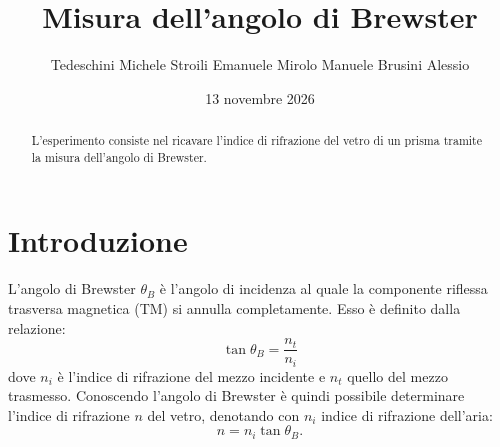 \documentclass[10pt,twocolumn]{article}
\begin{document}
    \justifying

      \title{\textbf{Misura dell'angolo di Brewster}}
      \author{Tedeschini Michele \hspace{0.7cm} Stroili Emanuele \hspace{0.7cm} Mirolo Manuele \hspace{0.7cm} Brusini Alessio}
      \date{13 novembre 2026}
      \maketitle
      \onecolumn
      \tableofcontents
    \vspace{3cm}
      \begin{abstract}
        \centering
        \large
        L'esperimento consiste nel ricavare l'indice di rifrazione del vetro di un prisma tramite la misura dell'angolo di Brewster.

      \end{abstract}

      \newpage
    \restoregeometry
    \twocolumn

\section{Introduzione}
L'angolo di Brewster $\theta_B$ è l'angolo di incidenza al quale la componente riflessa trasversa magnetica (TM) si annulla completamente. Esso è definito dalla relazione:
\begin{equation}
    \tan\theta_B = \frac{n_t}{n_i}
    \label{eq:brew}
\end{equation}
dove $n_i$ è l'indice di rifrazione del mezzo incidente e $n_t$ quello del mezzo trasmesso.
Conoscendo l'angolo di Brewster è quindi possibile determinare l'indice di rifrazione $n$ del vetro, denotando con $n_i$ indice di rifrazione dell'aria:
\begin{equation}
    n = n_i \tan\theta_B .
    \label{eq:n}
\end{equation}
\end{document}

